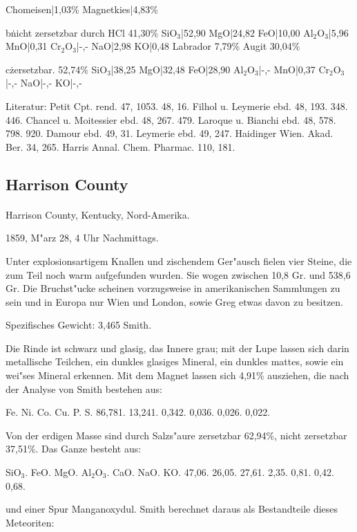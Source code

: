 \documentclass[a4paper, 11pt, oneside]{article}
\begin{document}
Chomeisen|1,03\%
Magnetkies|4,83\%

b\. nicht zersetzbar durch HCl 41,30\%
SiO$_{3}$|52,90  
MgO|24,82  
FeO|10,00  
Al$_{2}$O$_{3}$|5,96  
MnO|0,31  
Cr$_{2}$O$_{3}$|-,-  
NaO|2,98  
KO|0,48  
Labrador 7,79\%
Augit 30,04\%

c\. zersetzbar. 52,74\%
SiO$_{3}$|38,25  
MgO|32,48  
FeO|28,90  
Al$_{2}$O$_{3}$|-,-  
MnO|0,37  
Cr$_{2}$O$_{3}$|-,-  
NaO|-,-  
KO|-,-  

Literatur: Petit Cpt. rend. 47, 1053. 48, 16. Filhol u. Leymerie ebd. 48, 193. 348. 446. Chancel u. Moitessier ebd. 48, 267. 479. Laroque u. Bianchi ebd. 48, 578. 798. 920. Damour ebd. 49, 31. Leymerie ebd. 49, 247. Haidinger Wien. Akad. Ber. 34, 265. Harris Annal. Chem. Pharmac. 110, 181.

\subsection{Harrison County}
\normalsize
\paragraph{}
Harrison County, Kentucky, Nord-Amerika.

1859, M"arz 28, 4 Uhr Nachmittags.

Unter explosionsartigem Knallen und zischendem Ger"ausch fielen vier Steine, die zum Teil noch warm aufgefunden wurden. Sie wogen zwischen 10,8 Gr. und 538,6 Gr. Die Bruchst"ucke scheinen vorzugsweise in amerikanischen Sammlungen zu sein und in Europa nur Wien und London, sowie Greg etwas davon zu besitzen.

Spezifisches Gewicht: 3,465 Smith.

Die Rinde ist schwarz und glasig, das Innere grau; mit der Lupe lassen sich darin metallische Teilchen, ein dunkles glasiges Mineral, ein dunkles mattes, sowie ein wei"ses Mineral erkennen. Mit dem Magnet lassen sich 4,91\% ausziehen, die nach der Analyse von Smith bestehen aus:

Fe. Ni. Co. Cu. P. S.  
86,781. 13,241. 0,342. 0,036. 0,026. 0,022.

Von der erdigen Masse sind durch Salzs"aure zersetzbar 62,94\%, nicht zersetzbar 37,51\%. Das Ganze besteht aus:

SiO$_{3}$. FeO. MgO. Al$_{2}$O$_{3}$. CaO. NaO. KO.  
47,06. 26,05. 27,61. 2,35. 0,81. 0,42. 0,68.

und einer Spur Manganoxydul. Smith berechnet daraus als Bestandteile dieses Meteoriten:
\end{document}
